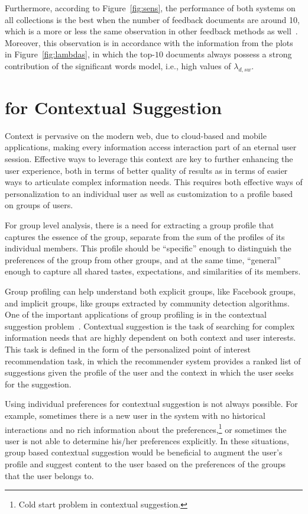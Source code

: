Furthermore, according to Figure~\ref{fig:sens}, the performance of both systems on all collections is the best when the number of feedback documents are around 10, which is a more or less the same observation in other feedback methods as well~\citep{Lv:2009}. Moreover, this observation is in accordance with the information from the plots in Figure~\ref{fig:lambdas}, in which the top-$10$ documents always possess a strong contribution of the significant words model, i.e., high values of $\lambda_{d,sw}$.


\section{\acswlm for Contextual Suggestion}
Context is pervasive on the modern web, due to cloud-based and mobile applications, making every information access interaction part of an eternal user session.  Effective ways to leverage this context are key to further enhancing the user experience, both in terms of better quality of results as in terms of easier ways to articulate complex information needs.  This requires both effective ways of personalization to an individual user as well as customization to a profile based on groups of users.

For group level analysis, there is a need for extracting a group profile that captures the essence of the group, separate from the sum of the profiles of its individual members. This profile should be ``specific'' enough to distinguish the preferences of the group from other groups, and at the same time, ``general'' enough to capture all shared tastes, expectations, and similarities of its members. 

Group profiling can help understand both explicit groups, like Facebook groups, and implicit groups, like groups extracted by community detection algorithms. One of the important applications of group profiling is in the contextual suggestion problem~\citep{hashemioverview}.  
Contextual suggestion is the task of searching for complex information needs that are highly dependent on both context and user interests. 
%
This task is defined in the form of the personalized point of interest recommendation task, in which the recommender system provides a ranked list of suggestions given the profile of the user and the context in which the user seeks for the suggestion.

Using individual preferences for contextual suggestion is not always possible.  For example, sometimes there is a new user in the system with no historical interactions and no rich information about the preferences,\footnote{Cold start problem in contextual suggestion.} or sometimes the user is not able to determine his/her preferences explicitly. In these situations, group based contextual suggestion would be beneficial to augment the user's profile and suggest content to the user based on the preferences of the groups that the user belongs to. 

